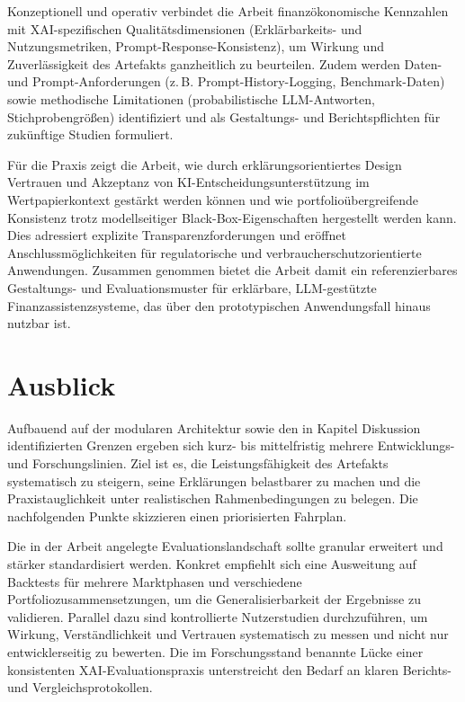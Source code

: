     Konzeptionell und operativ verbindet die Arbeit finanzökonomische Kennzahlen mit \acs{XAI}-spezifischen Qualitätsdimensionen (Erklärbarkeits- und Nutzungsmetriken, Prompt-Response-Konsistenz), um Wirkung und Zuverlässigkeit des Artefakts ganzheitlich zu beurteilen.
    Zudem werden Daten- und Prompt-Anforderungen (z.\,B. Prompt-History-Logging, Benchmark-Daten) sowie methodische Limitationen (probabilistische \acs{LLM}-Antworten, Stichprobengrößen) identifiziert und als Gestaltungs- und Berichtspflichten für zukünftige Studien formuliert.

    Für die Praxis zeigt die Arbeit, wie durch erklärungsorientiertes Design Vertrauen und Akzeptanz von \acs{KI}-Entscheidungsunterstützung im Wertpapierkontext gestärkt werden können und wie portfolioübergreifende Konsistenz trotz modellseitiger Black-Box-Eigenschaften hergestellt werden kann.
    Dies adressiert explizite Transparenzforderungen und eröffnet Anschlussmöglichkeiten für regulatorische und verbraucherschutzorientierte Anwendungen.
    Zusammen genommen bietet die Arbeit damit ein referenzierbares Gestaltungs- und Evaluationsmuster für erklärbare, \acs{LLM}-gestützte Finanzassistenzsysteme, das über den prototypischen Anwendungsfall hinaus nutzbar ist.

  \section{Ausblick}
  \label{sec:ausblick}

    Aufbauend auf der modularen Architektur sowie den in Kapitel Diskussion identifizierten Grenzen ergeben sich kurz- bis mittelfristig mehrere Entwicklungs- und Forschungslinien.
    Ziel ist es, die Leistungsfähigkeit des Artefakts systematisch zu steigern, seine Erklärungen belastbarer zu machen und die Praxistauglichkeit unter realistischen Rahmenbedingungen zu belegen.
    Die nachfolgenden Punkte skizzieren einen priorisierten Fahrplan.

    Die in der Arbeit angelegte Evaluationslandschaft sollte granular erweitert und stärker standardisiert werden.
    Konkret empfiehlt sich eine Ausweitung auf Backtests für mehrere Marktphasen und verschiedene Portfoliozusammensetzungen, um die Generalisierbarkeit der Ergebnisse zu validieren.
    Parallel dazu sind kontrollierte Nutzerstudien durchzuführen, um Wirkung, Verständlichkeit und Vertrauen systematisch zu messen und nicht nur entwicklerseitig zu bewerten.
    Die im Forschungsstand benannte Lücke einer konsistenten \acs{XAI}-Evaluationspraxis unterstreicht den Bedarf an klaren Berichts- und Vergleichsprotokollen.

